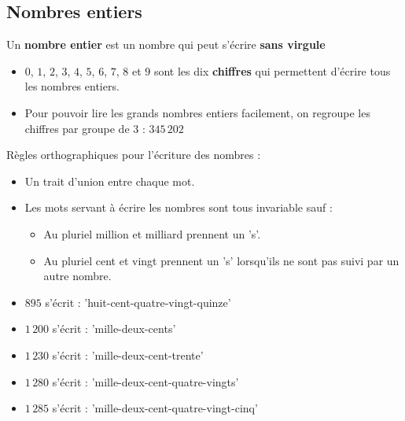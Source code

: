 \begin{pageCours} %


\section{Nombres entiers}

\begin{Def}
Un \textbf{nombre entier} est un nombre qui peut s'écrire \textbf{sans virgule}
\end{Def}

\begin{Rqs}
\begin{itemize}
\item $0$, $1$, $2$, $3$, $4$, $5$, $6$, $7$, $8$ et $9$ sont les dix \textbf{chiffres} qui permettent d'écrire tous les nombres entiers.
\item Pour pouvoir lire les grands nombres entiers facilement, on regroupe les chiffres par groupe de 3 : $345\,202$
\end{itemize}
\end{Rqs}

\begin{Reg}
Règles orthographiques pour l'écriture des nombres :
\begin{itemize}
    \item Un trait d'union entre chaque mot.
    \item Les mots servant à écrire les nombres sont tous invariable sauf :
    \begin{itemize}
        \item Au pluriel million et milliard prennent un 's'.
        \item Au pluriel cent et vingt prennent un 's' lorsqu'ils ne sont pas suivi par un autre nombre.
    \end{itemize}
\end{itemize}
\end{Reg}

\begin{Ex}
\begin{itemize}
\item $895$ s'écrit : 'huit-cent-quatre-vingt-quinze'
\item $1\,200$ s'écrit : 'mille-deux-cents'
\item $1\,230$ s'écrit : 'mille-deux-cent-trente'
\item $1\,280$ s'écrit : 'mille-deux-cent-quatre-vingts'
\item $1\,285$ s'écrit : 'mille-deux-cent-quatre-vingt-cinq'
\end{itemize}
\end{Ex}


\end{pageCours}
